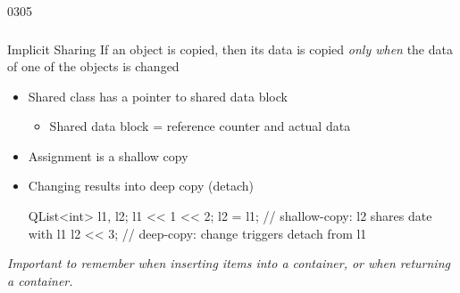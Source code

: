 \begin{slide}[fragile]{0305}\frametitle{}
\begin{block}{Implicit Sharing}
If an object is copied, then its data is copied \textit{only when} the data of one of
the objects is changed
\end{block}
\begin{itemize}
  \item Shared class has a pointer to shared data block
  \begin{itemize}
    \item Shared data block = reference counter and actual data
 \end{itemize}  
  \item Assignment is a shallow copy
  \item Changing results into deep copy (detach)
\begin{cpp}
QList<int> l1, l2; l1 << 1 << 2;
l2 = l1; // shallow-copy: l2 shares date with l1
l2 << 3; // deep-copy: change triggers detach from l1
\end{cpp}  
\end{itemize}
\textit{Important to remember when inserting items into a container, or when returning a container.}
\end{slide}
